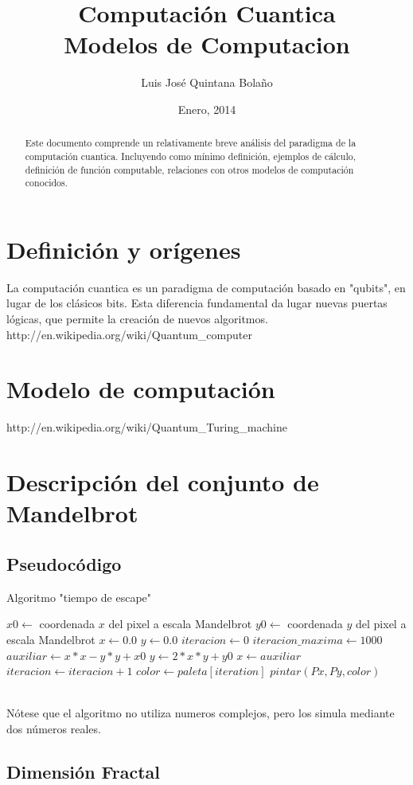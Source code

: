 \documentclass[a4paper]{article}
\title{Computación Cuantica \\ Modelos de Computacion}
\author{Luis José Quintana Bolaño}
\date{Enero, 2014}
\begin{document}
	\maketitle
	\begin{abstract}
	    Este documento comprende un relativamente breve análisis del paradigma de la computación cuantica. Incluyendo como mínimo definición, ejemplos de cálculo, definición de función computable, relaciones con otros modelos de computación conocidos.
  	\end{abstract}
  	
  	\section{Definición y orígenes}
  		La computación cuantica es un paradigma de computación basado en "qubits", en lugar de los clásicos bits. Esta diferencia fundamental da lugar nuevas puertas lógicas, que permite la creación de nuevos algoritmos.
  		http://en.wikipedia.org/wiki/Quantum_computer
  		\section{Modelo de computación}
  		http://en.wikipedia.org/wiki/Quantum_Turing_machine
  	\appendix
	\section{Descripción del conjunto de Mandelbrot}
		
	\subsection{Pseudocódigo} 
		\begin{algorithm}
			\caption{Algoritmo "tiempo de escape"}
			\begin{algorithmic}[1]
				\State $x0 \gets$ coordenada $x$ del pixel a escala Mandelbrot
  				\State $y0 \gets$ coordenada $y$ del pixel a escala Mandelbrot
  				\State $x \gets 0.0$
  				\State $y \gets 0.0$
  				\State $iteracion \gets 0$
				\State $iteracion\_maxima \gets 1000$
					\State $auxiliar \gets x*x - y*y + x0$
    				\State $y \gets 2*x*y + y0$
    				\State $x \gets auxiliar$
    				\State $iteracion \gets iteracion + 1$
				\EndWhile
				\State $color \gets paleta[iteration]$
  				\State $pintar(Px, Py, color)$
			\EndFor
			\end{algorithmic}
		\end{algorithm}			
	\\Nótese que el algoritmo no utiliza numeros complejos, pero los simula mediante dos números reales.
	\newpage
	\subsection{Dimensión Fractal}
\end{document}
